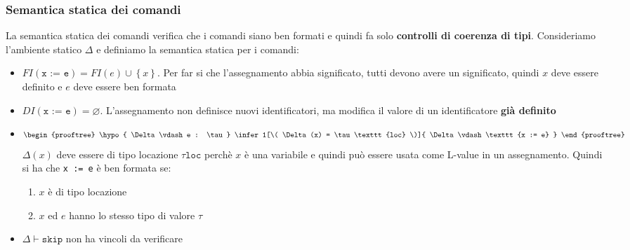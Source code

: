 \documentclass[a4paper]{article}
\begin{document}
\subsubsection{Semantica statica dei comandi}
La semantica statica dei comandi verifica che i comandi siano ben formati e quindi
fa solo \textbf{controlli di coerenza di tipi}. Consideriamo l'ambiente statico \( \Delta \)
e definiamo la semantica statica per i comandi:
\begin{itemize}
  \item \( FI(\texttt{x := e}) = FI(e) \cup \left\{ x \right\} \). Per far si che
    l'assegnamento abbia significato, tutti devono avere un significato, quindi
    \( x \) deve essere definito e \( e \) deve essere ben formata

  \item \( DI(\texttt{x := e}) = \varnothing \). L'assegnamento non definisce nuovi
    identificatori, ma modifica il valore di un identificatore \textbf{già definito}

  \item
    \[
      \begin{prooftree}
        \hypo{ 
          \Delta \vdash e : \tau
        }
        \infer1[\( \Delta(x) = \tau\texttt{loc} \)]{ 
          \Delta \vdash \texttt{x := e}
        }
      \end{prooftree}
    \] 
    \( \Delta(x) \) deve essere di tipo locazione \( \tau\texttt{loc} \) perchè \( x \) è
    una variabile e quindi può essere usata come L-value in un assegnamento.
    Quindi si ha che \texttt{x := e} è ben formata se:
    \begin{enumerate}
      \item \( x \) è di tipo locazione
      \item \( x \) ed \( e \) hanno lo stesso tipo di valore \( \tau \)
    \end{enumerate}

  \item \( \Delta \vdash \texttt{skip} \) non ha vincoli da verificare
\end{itemize}
\end{document}
